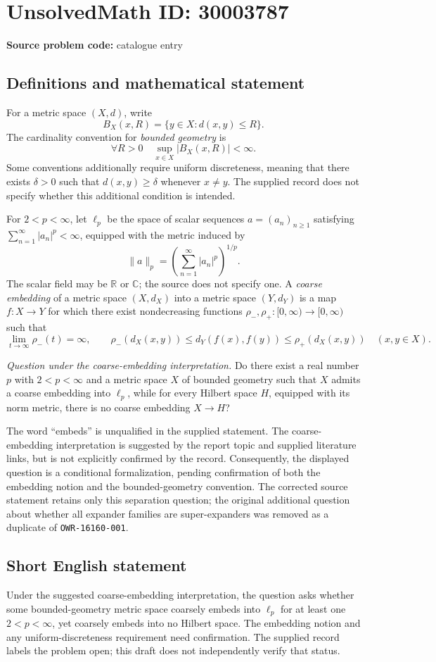 \documentclass[11pt]{article}
\newcommand{\R}{\mathbb{R}}
\newcommand{\C}{\mathbb{C}}
\begin{document}
\section*{UnsolvedMath ID: 30003787}
\textbf{Source problem code:} catalogue entry
\subsection{Definitions and mathematical statement}
For a metric space \((X,d)\), write
\[
B_X(x,R)=\{y\in X:d(x,y)\le R\}.
\]
The cardinality convention for \emph{bounded geometry} is
\[
\forall R>0\quad \sup_{x\in X}|B_X(x,R)|<\infty.
\]
Some conventions additionally require uniform discreteness, meaning that there exists \(\delta>0\) such that \(d(x,y)\ge\delta\) whenever \(x\ne y\). The supplied record does not specify whether this additional condition is intended.

For \(2<p<\infty\), let \(\ell_p\) be the space of scalar sequences \(a=(a_n)_{n\ge1}\) satisfying \(\sum_{n=1}^{\infty}|a_n|^p<\infty\), equipped with the metric induced by
\[
\|a\|_p=\left(\sum_{n=1}^{\infty}|a_n|^p\right)^{1/p}.
\]
The scalar field may be \(\R\) or \(\C\); the source does not specify one. A \emph{coarse embedding} of a metric space \((X,d_X)\) into a metric space \((Y,d_Y)\) is a map \(f:X\to Y\) for which there exist nondecreasing functions \(\rho_-,\rho_+:[0,\infty)\to[0,\infty)\) such that
\[
\lim_{t\to\infty}\rho_-(t)=\infty,
\qquad
\rho_-(d_X(x,y))\le d_Y(f(x),f(y))\le\rho_+(d_X(x,y))
\quad(x,y\in X).
\]

\emph{Question under the coarse-embedding interpretation.} Do there exist a real number \(p\) with \(2<p<\infty\) and a metric space \(X\) of bounded geometry such that \(X\) admits a coarse embedding into \(\ell_p\), while for every Hilbert space \(H\), equipped with its norm metric, there is no coarse embedding \(X\to H\)?

The word ``embeds'' is unqualified in the supplied statement. The coarse-embedding interpretation is suggested by the report topic and supplied literature links, but is not explicitly confirmed by the record. Consequently, the displayed question is a conditional formalization, pending confirmation of both the embedding notion and the bounded-geometry convention. The corrected source statement retains only this separation question; the original additional question about whether all expander families are super-expanders was removed as a duplicate of \texttt{OWR-16160-001}.
\subsection{Short English statement}
Under the suggested coarse-embedding interpretation, the question asks whether some bounded-geometry metric space coarsely embeds into \(\ell_p\) for at least one \(2<p<\infty\), yet coarsely embeds into no Hilbert space. The embedding notion and any uniform-discreteness requirement need confirmation. The supplied record labels the problem open; this draft does not independently verify that status.
\end{document}
